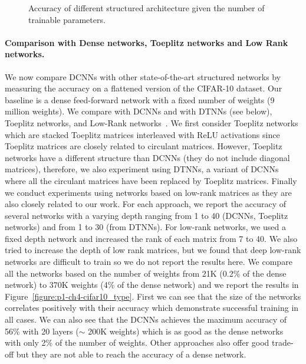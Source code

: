 \begin{figure}
   \centering
   
   \caption{Accuracy of different structured architecture given the number of trainable parameters.}
   \label{figure:p1-ch4-cifar10_with_channels_xp}
\end{figure}


\paragraph{Comparison with Dense networks, Toeplitz networks and Low Rank networks.}
We now compare DCNNs with other state-of-the-art structured networks by measuring the accuracy on a flattened version of the CIFAR-10 dataset.
Our baseline is a dense feed-forward network with a fixed number of weights (9 million weights).
We compare with DCNNs and with DTNNs (see below), Toeplitz networks, and Low-Rank networks~\cite{yu2017compressing}.
We first consider Toeplitz networks which are stacked Toeplitz matrices interleaved with ReLU activations since Toeplitz matrices are closely related to circulant matrices.
However, Toeplitz networks have a different structure than DCNNs (they do not include diagonal matrices), therefore, we also experiment using DTNNs, a variant of DCNNs where all the circulant matrices have been replaced by Toeplitz matrices.
Finally we conduct experiments using networks based on low-rank matrices as they are also closely related to our work.
For each approach, we report the accuracy of several networks with a varying depth ranging from 1 to 40 (DCNNs, Toeplitz networks) and from 1 to 30 (from DTNNs).
For low-rank networks, we used a fixed depth network and increased the rank of each matrix from 7 to 40.
We also tried to increase the depth of low rank matrices, but we found that deep low-rank networks are difficult to train so we do not report the results here.
We compare all the networks based on the number of weights from 21K (0.2\% of the dense network) to 370K weights (4\% of the dense network) and we report the results in Figure~\ref{figure:p1-ch4-cifar10_type}. 
First we can see that the size of the networks correlates positively with their accuracy which demonstrate successful training in all cases.
We can also see that the DCNNs achieves the maximum accuracy of 56\% with 20 layers ($\sim$ 200K weights) which is as good as the dense networks with only 2\% of the number of weights.
Other approaches also offer good trade-off but they are not able to reach the accuracy of a dense network.


